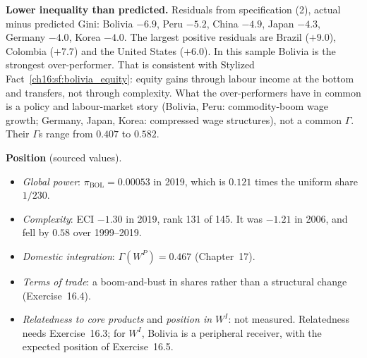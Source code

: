 \documentclass[../solutions_manual.tex]{subfiles}
\begin{document}
 \textbf{Lower inequality than predicted.} Residuals from specification (2), actual minus predicted Gini: Bolivia $-6.9$, Peru $-5.2$, China $-4.9$, Japan $-4.3$, Germany $-4.0$, Korea $-4.0$. The largest positive residuals are Brazil ($+9.0$), Colombia ($+7.7$) and the United States ($+6.0$). In this sample Bolivia is the strongest over-performer. That is consistent with Stylized Fact~\ref{ch16:sf:bolivia_equity}: equity gains through labour income at the bottom and transfers, not through complexity. What the over-performers have in common is a policy and labour-market story (Bolivia, Peru: commodity-boom wage growth; Germany, Japan, Korea: compressed wage structures), not a common $\Gamma$. Their $\Gamma$s range from $0.407$ to $0.582$.


 \textbf{Position} (sourced values).
\begin{itemize}
\item \emph{Global power}: $\pi_{\text{BOL}} = 0.00053$ in 2019, which is $0.121$ times the uniform share $1/230$.
\item \emph{Complexity}: ECI $-1.30$ in 2019, rank 131 of 145. It was $-1.21$ in 2006, and fell by $0.58$ over 1999--2019.
\item \emph{Domestic integration}: $\Gamma(W^P) = 0.467$ (Chapter~17).
\item \emph{Terms of trade}: a boom-and-bust in shares rather than a structural change (Exercise~16.4).
\item \emph{Relatedness to core products} and \emph{position in $W^I$}: not measured. Relatedness needs Exercise~16.3; for $W^I$, Bolivia is a peripheral receiver, with the expected position of Exercise~16.5.
\end{itemize}
\end{document}
